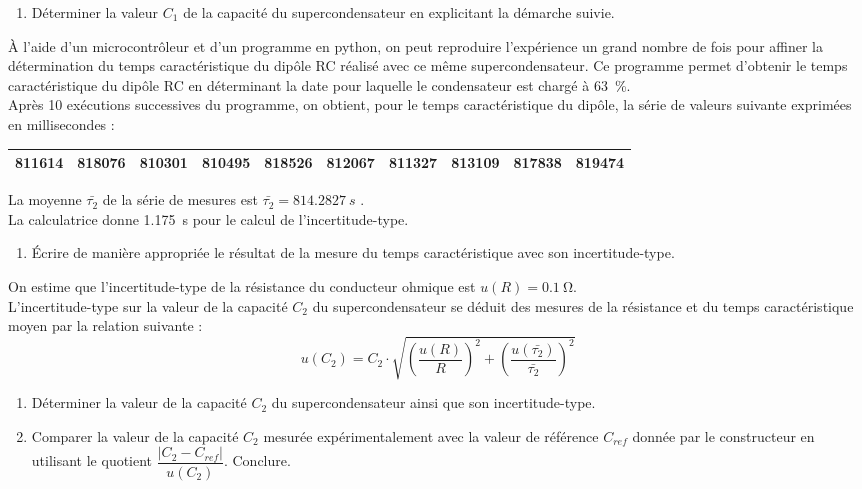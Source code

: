 \documentclass[a4paper,11pt,fleqn]{article}%
\begin{document}
		\begin{enumerate}[resume]
			\item Déterminer la valeur $C_1$ de la capacité du supercondensateur en explicitant la démarche suivie.
		\end{enumerate}
		À l'aide d'un microcontrôleur et d'un programme en python, on peut reproduire l'expérience un grand nombre de fois pour affiner la détermination du temps caractéristique du dipôle RC réalisé avec ce même supercondensateur. Ce programme permet d'obtenir le temps caractéristique du dipôle RC en déterminant la date pour laquelle le condensateur est chargé à \SI{63}{\percent}.\\
		Après 10 exécutions successives du programme, on obtient, pour le temps caractéristique du dipôle, la série de valeurs suivante exprimées en millisecondes :
		\begin{table}[h!]
			\begin{tabular}{|c|c|c|c|c|c|c|c|c|c|}
				\hline
				811614 & 818076 & 810301 & 810495 & 818526 & 812067 & 811327 & 813109 & 817838 & 819474\\
				\hline
			\end{tabular}
		\end{table}
		La moyenne $\bar{\tau_2}$ de la série de mesures est $\bar{\tau_2} = \SI{814,2827}{s}$ .\\
		La calculatrice donne \SI{1,175}{s} pour le calcul de l'incertitude-type.
		\begin{enumerate}[resume]
			\item Écrire de manière appropriée le résultat de la mesure du temps caractéristique avec son incertitude-type.
		\end{enumerate}
		On estime que l’incertitude-type de la résistance du conducteur ohmique est $u(R) = \SI{0,1}{\ohm}$.\\
		L'incertitude-type sur la valeur de la capacité $C_2$ du supercondensateur se déduit des mesures de la résistance et du temps caractéristique moyen par la relation suivante : $$ u(C_2) = C_2 \cdot \sqrt{\left(\dfrac{u(R)}{R}\right)^2 + \left(\dfrac{u(\bar{\tau_2})}{\bar{\tau_2}}\right)^2}$$
		\begin{enumerate}[resume]
			\item Déterminer la valeur de la capacité $C_2$ du supercondensateur ainsi que son incertitude-type.
			\item Comparer la valeur de la capacité $C_2$ mesurée expérimentalement avec la valeur de référence $C_{ref}$ donnée par le constructeur en utilisant le quotient $\dfrac{|C_2 - C_{ref}|}{u(C_2)}$. Conclure.
		\end{enumerate}
		
\end{document}

